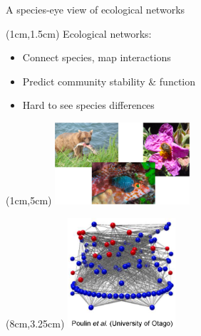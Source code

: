\documentclass{beamer}
\newcommand*\whitem{%
  \item[\color{white}\scalebox{0.9}{\textbullet}]}
\begin{document}
    \begin{frame}{A species-eye view of ecological networks}
      \begin{textblock*}{10cm}(1cm,1.5cm)
        Ecological networks:
        \begin{itemize}
          \item Connect species, map interactions
          \item Predict community stability \& function
          \whitem {\color{white}Hard to see species differences}
        \end{itemize}
        \end{textblock*}
      \begin{textblock*}{5cm}(1cm,5cm)
        \includegraphics[width=5cm]{intro_figs/interaction_examples.eps}
        \end{textblock*}
      \begin{textblock*}{5cm}(8cm,3.25cm)
        \includegraphics[width=4cm]{intro_figs/Otagoweb.eps}
        \end{textblock*}    
      \end{frame}

\end{document}
